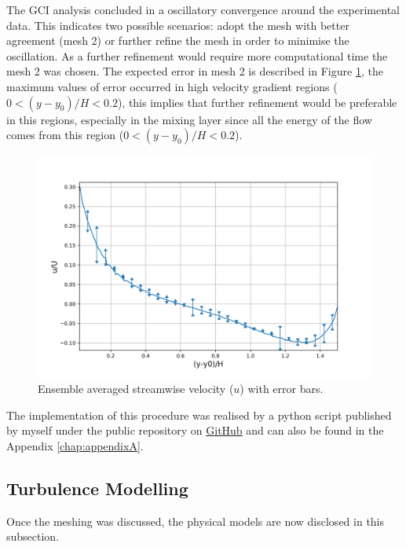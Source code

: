 \documentclass[../main.tex]{subfiles}
\begin{document}
The GCI analysis concluded in a oscillatory convergence around the experimental data. This indicates two possible scenarios: adopt the mesh with better agreement (mesh 2) or further refine the mesh in order to minimise the oscillation. As a further refinement would require more computational time the mesh 2 was chosen. The expected error in mesh 2 is described in Figure \ref{fig:gciErrorbar}, the maximum values of error occurred in high velocity gradient regions ($0<(y-y_0)/H<0.2$), this implies that further refinement would be preferable in this regions, especially in the mixing layer since all the energy of the flow comes from this region ($0<(y-y_0)/H<0.2$).
\begin{figure}[!ht]
\centering
\includegraphics[width=\linewidth]{../images/methods/gciMediumWithErrorbars.png}
\caption{Ensemble averaged streamwise velocity ($u$) with error bars.}
\label{fig:gciErrorbar}
\end{figure}

The implementation of this procedure was realised by a python script published by myself under the public repository on \href{https://github.com/Worth-Option/gci}{GitHub} and can also be found in the Appendix \autoref{chap:appendixA}.

\subsection{Turbulence Modelling}
Once the meshing was discussed, the physical models are now disclosed in this subsection.
\end{document}
